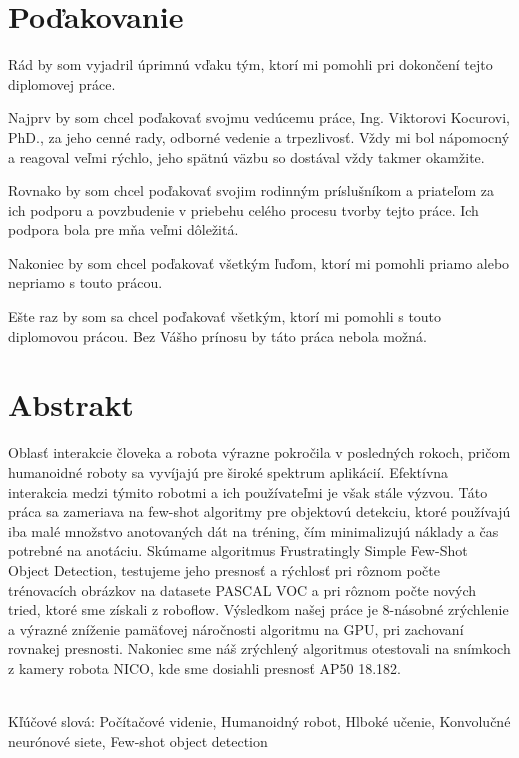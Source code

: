 \documentclass[12pt, a4paper, oneside]{book}
\begin{document}
\chapter*{Poďakovanie}\label{chap:thank_you}
Rád by som vyjadril úprimnú vďaku tým, ktorí mi pomohli pri dokončení tejto diplomovej práce.

Najprv by som chcel poďakovať svojmu vedúcemu práce, Ing. Viktorovi Kocurovi, PhD., za jeho cenné rady, odborné vedenie a trpezlivosť. Vždy mi bol nápomocný a reagoval veľmi rýchlo, jeho spätnú väzbu so dostával vždy takmer okamžite. 

Rovnako by som chcel poďakovať svojim rodinným príslušníkom a priateľom za ich  podporu a povzbudenie v priebehu celého procesu tvorby tejto práce. Ich podpora bola pre mňa veľmi dôležitá.

Nakoniec by som chcel poďakovať všetkým ľuďom, ktorí mi pomohli priamo alebo nepriamo s touto prácou.

Ešte raz by som sa chcel poďakovať všetkým, ktorí mi pomohli s touto diplomovou prácou. Bez Vášho prínosu by táto práca nebola možná.

\vfill\eject 

\chapter*{Abstrakt}\label{chap:abstract_sk}

Oblasť interakcie človeka a robota výrazne pokročila v posledných rokoch, pričom humanoidné roboty sa vyvíjajú pre široké spektrum aplikácií. Efektívna interakcia medzi týmito robotmi a ich používateľmi je však stále výzvou. Táto práca sa zameriava na few-shot algoritmy pre objektovú detekciu, ktoré používajú iba malé množstvo anotovaných dát na tréning, čím minimalizujú náklady a čas potrebné na anotáciu. Skúmame algoritmus Frustratingly Simple Few-Shot Object Detection, testujeme jeho presnosť a rýchlosť pri rôznom počte trénovacích obrázkov na datasete PASCAL VOC a pri rôznom počte nových tried, ktoré sme získali z roboflow. Výsledkom našej práce je 8-násobné zrýchlenie a výrazné zníženie pamäťovej náročnosti algoritmu na GPU, pri zachovaní rovnakej presnosti. Nakoniec sme náš zrýchlený algoritmus otestovali na snímkoch z kamery robota NICO, kde sme dosiahli presnosť AP50 18.182.

~\\
Kľúčové slová: Počítačové videnie, Humanoidný robot, Hlboké učenie, Konvolučné neurónové siete, Few-shot object detection 
\vfill\eject 
\end{document}
